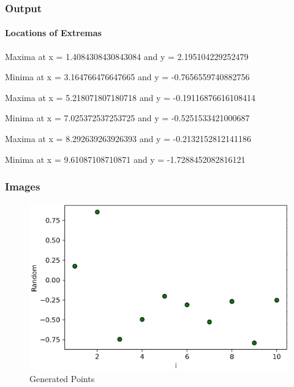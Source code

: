 \subsubsection{Output}


\paragraph{Locations of Extremas}

\begin{description}
	\item Maxima at x = 1.4084308430843084 and y = 2.195104229252479
	\item Minima at x = 3.164766476647665 and y = -0.7656559740882756
	\item Maxima at x = 5.218071807180718 and y = -0.19116876616108414
	\item Minima at x = 7.025372537253725 and y = -0.5251533421000687
	\item Maxima at x = 8.292639263926393 and y = -0.2132152812141186
	\item Minima at x = 9.61087108710871 and y = -1.7288452082816121
\end{description}


\subsubsection{Images}

\begin{figure}[!ht]
	\includegraphics{question_1/Points.eps} 
	\caption{Generated Points}
\end{figure} 

